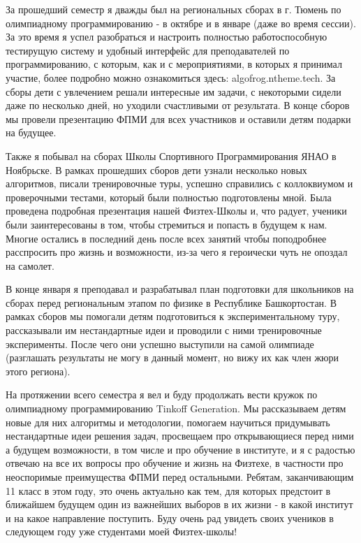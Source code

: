 \quad За прошедший семестр я дважды был на региональных сборах в г. Тюмень по олимпиадному программированию - в октябре и в январе (даже во
время сессии). За это время я успел разобраться и настроить полностью работоспособную тестирущую систему и удобный интерфейс для преподавателей
по программированию, с которым, как и с мероприятиями, в которых я принимал участие, более подробно можно ознакомиться здесь:
algofrog.ntheme.tech. За сборы дети с увлечением решали интересные им задачи, с некоторыми сидели даже по несколько дней, но уходили
счастливыми от результата.  В конце сборов мы провели презентацию ФПМИ для всех участников и оставили детям подарки на будущее.

\quad Также я побывал на сборах Школы Спортивного Программирования ЯНАО в Ноябрьске. В рамках прошедших сборов дети узнали несколько новых
алгоритмов, писали тренировочные туры, успешно справились с коллоквиумом и проверочными тестами, который были полностью подготовлены мной.
Была проведена подробная презентация нашей Физтех-Школы и, что радует, ученики были заинтересованы в том, чтобы стремиться и попасть в будущем
к нам. Многие остались в последний день после всех занятий чтобы поподробнее расспросить про жизнь и возможности, из-за чего я героически
чуть не опоздал на самолет.

\quad В конце января я преподавал и разрабатывал план подготовки для школьников на сборах перед региональным этапом по физике в Республике
Башкортостан. В рамках сборов мы помогали детям подготовиться к экспериментальному туру, рассказывали им нестандартные идеи и проводили с ними
тренировочные эксперименты. После чего они успешно выступили на самой олимпиаде (разглашать результаты не могу в данный момент, но вижу их как
член жюри этого региона).

\quad На протяжении всего семестра я вел и буду продолжать вести кружок по олимпиадному программированию Tinkoff Generation. Мы рассказываем
детям новые для них алгоритмы и методологии, помогаем научиться придумывать нестандартные идеи решения задач, просвещаем про открывающиеся
перед ними а будущем возможности, в том числе и про обучение в институте, и я с радостью отвечаю на все их вопросы про обучение и жизнь на
Физтехе, в частности про неоспоримые преимущества ФПМИ перед остальными. Ребятам, заканчивающим 11 класс в этом году, это очень актуально как
тем, для которых предстоит в ближайшем будущем один из важнейших выборов в их жизни ‐ в какой институт и на какое направление поступить. Буду
очень рад увидеть своих учеников в следующем году уже студентами моей Физтех-школы!

